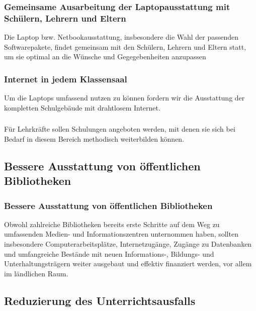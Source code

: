 \subsubsection{Gemeinsame Ausarbeitung der Laptopausstattung mit Schülern, Lehrern und Eltern}
\abstimmung
Die Laptop bzw. Netbookausstattung, insbesondere die Wahl der passenden Softwarepakete, findet gemeinsam mit den Schülern, Lehrern und Eltern statt, um sie optimal an die Wünsche und Gegegebenheiten anzupassen

\subsubsection{Internet in jedem Klassensaal}
\abstimmung
Um die Laptops umfassend nutzen zu können fordern wir die Ausstattung der kompletten Schulgebäude mit drahtlosem Internet.

\subsubsection{ }
\abstimmung
Für Lehrkräfte sollen Schulungen angeboten werden, mit denen sie sich bei Bedarf in diesem Bereich methodisch weiterbilden können.
 
\subsection*{Bessere Ausstattung von öffentlichen Bibliotheken}

\subsubsection{Bessere Ausstattung von öffentlichen Bibliotheken}
\abstimmung
Obwohl zahlreiche Bibliotheken bereits erste Schritte auf dem Weg zu umfassenden Medien- und Informationszentren unternommen haben, sollten insbesondere Computerarbeitsplätze, Internetzugänge, Zugänge zu Datenbanken und umfangreiche Bestände mit neuen Informations-, Bildungs- und Unterhaltungsträgern weiter ausgebaut und effektiv finanziert werden, vor allem im ländlichen Raum.
 
\subsection*{Reduzierung des Unterrichtsausfalls}

